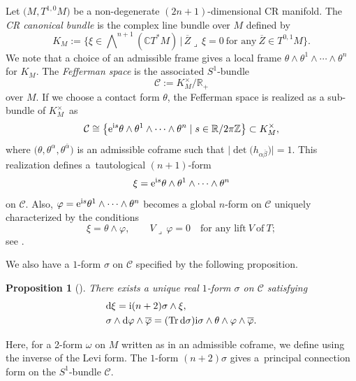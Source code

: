 \documentclass[11pt]{article}
\numberwithin{equation}{section}
\renewcommand\a{\alpha}
\renewcommand\b{\beta}
\renewcommand\th{\theta}
\newcommand\ol{\overline}
\numberwithin{equation}{section}
\newtheorem{Proposition}[Theorem]{Proposition}
 { \theoremstyle{definition}
\newtheorem{Definition}[Theorem]{Definition}
\newtheorem*{Notation}{Notation}
\newtheorem{Example}[Theorem]{Example}
\newtheorem{Remark}[Theorem]{Remark} }
\begin{document}
Let $\bigl(M, T^{1, 0}M\bigr)$ be a non-degenerate $(2n+1)$-dimensional CR manifold.
The {\it CR canonical bundle} is the complex line bundle over $M$ defined by
\[
K_M:=\biggl\{\xi\in\bigwedge\nolimits^{\!n+1}(\mathbb{C}T^*M)\, \Big|\, \ol Z\lrcorner\, \xi=0\ \textrm{for any}\ \ol Z\in T^{0,1}M\biggr\}.
\]
We note that a choice of an admissible frame gives a local frame $\th\wedge\th^1\wedge\cdots\wedge\th^n$ for $K_M$. The {\it Fefferman space} is the associated $S^1$-bundle
\[
\mathcal{C}:=K^\times_M/\mathbb{R}_+
\]
over $M$. If we choose a contact form $\th$, the Fefferman space is realized as a sub-bundle of $K^\times_M$~as%
\begin{equation}\label{embed-C}
\mathcal{C}\cong \bigl\{{\rm e}^{{\rm i}s}\th\wedge\th^1\wedge\cdots\wedge\th^n\mid s\in \mathbb{R}/2\pi\mathbb{Z}\bigr\} \subset K^\times_M,
\end{equation}
where $\bigl(\th, \th^\a, \th^{\ol\a}\bigr)$ is an admissible coframe such that $\bigl|\det\bigl(h_{\a\ol\b}\bigr)\bigr|=1$. This realization defines a~tautological $(n+1)$-form
\[
\xi={\rm e}^{{\rm i}s}\th\wedge\th^1\wedge\cdots\wedge\th^n
\]
on $\mathcal{C}$. Also, $\varphi={\rm e}^{{\rm i}s}\th^1\wedge\cdots\wedge\th^n$ becomes a global $n$-form on $\mathcal{C}$ uniquely characterized by the conditions
\[
\xi=\th\wedge\varphi, \qquad V\lrcorner\, \varphi=0\quad \text{for any lift}\ V\ \text{of}\ T;
\]
see {\cite[Lemma 3.3]{Lee}}.

We also have a $1$-form $\sigma$ on $\mathcal{C}$ specified by the following proposition.

\begin{Proposition}[{\cite[Proposition 3.4]{Lee}}]\label{sigma-condition}
There exists a unique real $1$-form $\sigma$ on $\mathcal{C}$ satisfying
\begin{align*}
&{\rm d}\xi={\rm i}(n+2)\sigma\wedge\xi, \\
&\sigma\wedge {\rm d}\varphi\wedge\ol\varphi=(\operatorname{Tr} {\rm d}\sigma){\rm i}\sigma\wedge\th\wedge\varphi\wedge\ol\varphi.
\end{align*}
\end{Proposition}
Here, for a 2-form $\omega$ on $M$ written as \smash{$\omega={\rm i}\omega_{\a\ol\b}\th^\a\wedge\th^{\ol\b}+\cdots$} in an admissible coframe, we define
\smash{$\operatorname{Tr} \omega:=h^{\a\ol\b}\omega_{\a\ol\b}$} using the inverse \smash{$h^{\a\ol\b}$} of the Levi form. The $1$-form $(n+2)\sigma$ gives a~principal connection form on the $S^1$-bundle $\mathcal{C}$.
\end{document}
